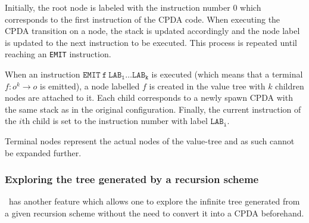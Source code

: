 Initially, the root node is labeled with the instruction number $0$ which corresponds to the first instruction of the CPDA code. When executing the CPDA transition on a node, the stack is updated accordingly and the node label is updated to the next instruction to be executed. This process is repeated until reaching an {\tt EMIT} instruction.

When an instruction $\mathtt{EMIT\ f\ LAB_1 \ldots LAB_k}$ is executed (which means that a terminal $f:o^k\rightarrow o$ is emitted), a node labelled $f$ is created in the value tree with $k$ children nodes are attached to it. Each child corresponds to a newly spawn CPDA with the same stack as in the original configuration. Finally, the current instruction of the  $i$th child is set to the instruction number with label $\mathtt{LAB_i}$.

Terminal nodes represent the actual nodes of the value-tree and as such cannot be expanded further.

\subsubsection{Exploring the tree generated by a recursion scheme}

\toolname\ has another feature which allows one to explore the infinite tree generated from a given recursion scheme without the need to convert it into a CPDA beforehand.


    
    


